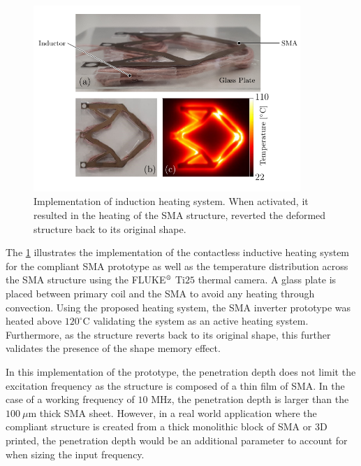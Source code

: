 \begin{figure}[t]
    \centering
    \includegraphics[width=0.9\textwidth]{images/chap5/induction-heating-temp-annotated.pdf}
    \caption[Implementation of induction heating system]{Implementation of induction heating system. When activated, it resulted in the heating of the SMA structure, reverted the deformed structure back to its original shape.}
    \label{fig:induction-heating-temp}
\end{figure}

The \cref{fig:induction-heating-temp} illustrates the implementation of the contactless inductive heating system for the compliant SMA prototype as well as the temperature distribution across the SMA structure using the FLUKE$\textsuperscript \textregistered$ Ti$25$ thermal camera. A glass plate is placed between primary coil and the SMA to avoid any heating through convection. Using the proposed heating system, the SMA inverter prototype was heated above $120^{\circ}$C validating the system as an active heating system. Furthermore, as the structure reverts back to its original shape, this further validates the presence of the shape memory effect.

In this implementation of the prototype, the penetration depth does not limit the excitation frequency as the structure is composed of a thin film of SMA. In the case of a working frequency of $10$ MHz, the penetration depth is larger than the $100~\mu$m thick SMA sheet. However, in a real world application where the compliant structure is created from a thick monolithic block of SMA or 3D printed, the penetration depth would be an additional parameter to account for when sizing the input frequency.

